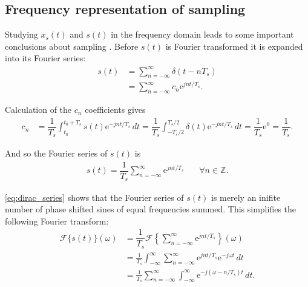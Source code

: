 \subsection{Frequency representation of sampling}
Studying $x_s(t)$ and $s(t)$ in the frequency domain leads to some important conclusions about sampling \cite{pages 164-166, DTSP}. Before $s(t)$ is Fourier transformed it is expanded into its Fourier series:
\begin{align*}
s(t)&=\sum_{n=-\infty}^{\infty}\delta(t-nT_s) \\
&=\sum_{n=-\infty}^{\infty}c_n\mathrm{e}^{j nt/T_s}.
\end{align*}

Calculation of the $c_n$ coefficients gives
\begin{align*}
c_n &= \dfrac{1}{T_s} \int_{t_0}^{t_0+T_s} \! s(t) \mathrm{e}^{-jnt/T_s} \, dt = \dfrac{1}{T_s} \int_{-T_s/2}^{T_s/2} \! \delta(t) \mathrm{e}^{-jnt/T_s} \, dt= \dfrac{1}{T_s}\mathrm{e}^0 = \dfrac{1}{T_s}.
\end{align*}

And so the Fourier series of $s(t)$ is
\begin{align}\label{eq:dirac_series}
s(t) = \dfrac{1}{T_s} \sum_{n=-\infty}^{\infty} \mathrm{e}^{jnt/T_s} \phantom{mm} \forall n\in \mathbb{Z}.
\end{align}

\eqref{eq:dirac_series} shows that the Fourier series of $s(t)$ is merely an inifite number of phase shifted sines of equal frequencies summed. This simplifies the following Fourier transform:
\begin{align} \label{eq:fourier_comb1}
\mathcal{F}\{s(t)\}(\omega) &= \dfrac{1}{T_s} \mathcal{F}\left\{\sum_{n=-\infty}^{\infty} \mathrm{e}^{jnt/T_s} \right\} (\omega) \nonumber \\
&= \frac{1}{T_s} \int_{-\infty}^{\infty} \! \sum_{n=-\infty}^{\infty} \mathrm{e}^{jnt/T_s} \mathrm{e}^{-j\omega t} \, dt \nonumber \\
&= \frac{1}{T_s} \sum_{n=-\infty}^{\infty} \int_{-\infty}^{\infty} \! \mathrm{e}^{-j(\omega-n/T_s)t} \, dt.
\end{align}

